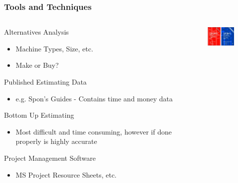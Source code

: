 \begin{frame}
\frametitle{Tools and Techniques} 

\begin{columns}
\begin{column}{0.7\textwidth}
Alternatives Analysis
\begin{itemize}
	\item Machine Types, Size, etc.
	\item Make or Buy?
\end{itemize}
Published Estimating Data
\begin{itemize}
	\item e.g. Spon’s Guides - Contains time and money data
\end{itemize}
Bottom Up Estimating
\begin{itemize}
	\item Most difficult and time consuming, however if done properly is highly accurate
\end{itemize}	
Project Management Software 
\begin{itemize}
	\item MS Project Resource Sheets, etc. 
\end{itemize}
\end{column}

\begin{column}{0.3\textwidth}
\begin{figure}
	\centering
		\includegraphics[width = 3cm]{images/sponbooks.jpg}
	\label{fig:sponbooks}
\end{figure}
\end{column}
\end{columns}
\end{frame}




